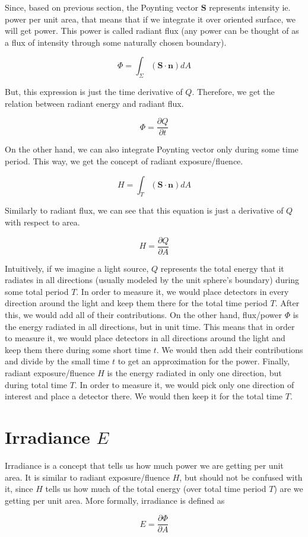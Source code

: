 \documentclass{article}
\begin{document}
Since, based on previous section, the Poynting vector $\mathbf{S}$ represents intensity ie. power per unit area, that means that if we integrate it over oriented surface, we will get power. This power is called radiant flux (any power can be thought of as a flux of intensity through some naturally chosen boundary).

\[ \Phi = \int_{\Sigma} (\mathbf{S} \cdot \mathbf{n})dA \]

But, this expression is just the time derivative of $Q$. Therefore, we get the relation between radiant energy and radiant flux.

\[ \Phi = \frac{\partial Q}{\partial t} \]

On the other hand, we can also integrate Poynting vector only during some time period. This way, we get the concept of radiant exposure/fluence.

\[ H = \int_{T}(\mathbf{S} \cdot \mathbf{n})dA \]

Similarly to radiant flux, we can see that this equation is just a derivative of $Q$ with respect to area.

\[ H = \frac{\partial Q}{\partial A} \]

Intuitively, if we imagine a light source, $Q$ represents the total energy that it radiates in all directions (usually modeled by the unit sphere's boundary) during some total period $T$. In order to measure it, we would place detectors in every direction around the light and keep them there for the total time period $T$. After this, we would add all of their contributions. On the other hand, flux/power $\Phi$ is the energy radiated in all directions, but in unit time. This means that in order to measure it, we would place detectors in all directions around the light and keep them there during some short time $t$. We would then add their contributions and divide by the small time $t$ to get an approximation for the power. Finally, radiant exposure/fluence $H$ is the energy radiated in only one direction, but during total time $T$. In order to measure it, we would pick only one direction of interest and place a detector there. We would then keep it for the total time $T$.

\section{Irradiance $E$}

Irradiance is a concept that tells us how much power we are getting per unit area. It is similar to radiant exposure/fluence $H$, but should not be confused with it, since $H$ tells us how much of the total energy (over total time period $T$) are we getting per unit area. More formally, irradiance is defined as

\[ E = \frac{\partial \Phi}{\partial A} \]
\end{document}
